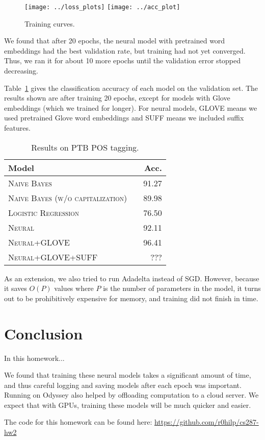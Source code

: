 \documentclass[11pt]{article}
\begin{document}
\begin{figure}
	\centering
	\texttt{[image: ../loss\_plots]}
	\texttt{[image: ../acc\_plot]}
	\caption{\label{fig:loss} Training curves.}
\end{figure}

We found that after 20 epochs, the neural model with pretrained word embeddings had the best validation rate, but training had not yet converged. Thus, we ran it for about 10 more epochs until the validation error stopped decreasing.

Table~\ref{tab:results} gives the classification accuracy of each model on the validation set. The results shown are after training 20 epochs, except for models with Glove embeddings (which we trained for longer). For neural models, GLOVE means we used pretrained Glove word embeddings and SUFF means we included suffix features.

\begin{table}[h]
\centering
\begin{tabular}{llr}
 \toprule
 Model &  & Acc. \\
 \midrule
 \textsc{Naive Bayes} & & 91.27\\
 \textsc{Naive Bayes (w/o capitalization)} & & 89.98 \\
 \textsc{Logistic Regression} & & 76.50 \\
 \textsc{Neural} & & 92.11  \\
 \textsc{Neural+GLOVE} & &96.41 \\
 \textsc{Neural+GLOVE+SUFF} & & ??? \\
 \bottomrule
\end{tabular}
\caption{\label{tab:results} Results on PTB POS tagging.}
\end{table}

As an extension, we also tried to run Adadelta instead of SGD. However, because it saves $O(P)$ values where $P$ is the number of parameters in the model, it turns out to be prohibitively expensive for memory, and training did not finish in time.

\section{Conclusion}

In this homework...

We found that training these neural models takes a significant amount of time, and thus careful logging and saving models after each epoch was important. Running on Odyssey also helped by offloading computation to a cloud server. We expect that with GPUs, training these models will be much quicker and easier.

The code for this homework can be found here: \url{https://github.com/r0hilp/cs287-hw2}



\end{document}
